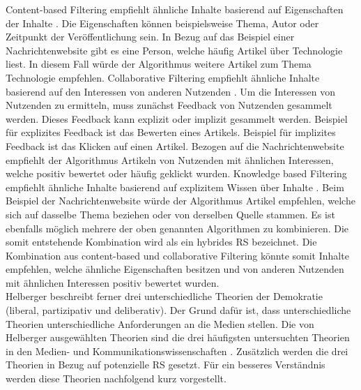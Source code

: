 Content-based Filtering empfiehlt ähnliche Inhalte basierend auf Eigenschaften der Inhalte \cite{content-based-rs}.
Die Eigenschaften können beispielsweise Thema, Autor oder Zeitpunkt der Veröffentlichung sein.
In Bezug auf das Beispiel einer Nachrichtenwebsite gibt es eine Person, welche häufig Artikel über Technologie liest.
In diesem Fall würde der Algorithmus weitere Artikel zum Thema Technologie empfehlen.
Collaborative Filtering empfiehlt ähnliche Inhalte basierend auf den Interessen von anderen Nutzenden \cite{collaborative-filtering-rs}.
Um die Interessen von Nutzenden zu ermitteln, muss zunächst Feedback von Nutzenden gesammelt werden.
Dieses Feedback kann explizit oder implizit gesammelt werden.
Beispiel für explizites Feedback ist das Bewerten eines Artikels.
Beispiel für implizites Feedback ist das Klicken auf einen Artikel.
Bezogen auf die Nachrichtenwebsite empfiehlt der Algorithmus Artikeln von Nutzenden mit ähnlichen Interessen, welche positiv bewertet oder häufig geklickt wurden.
Knowledge based Filtering empfiehlt ähnliche Inhalte basierend auf explizitem Wissen über Inhalte \cite{knowledge-based-rs}.
Beim Beispiel der Nachrichtenwebsite würde der Algorithmus Artikel empfehlen, welche sich auf dasselbe Thema beziehen oder von derselben Quelle stammen.
Es ist ebenfalls möglich mehrere der oben genannten Algorithmen zu kombinieren.
Die somit entstehende Kombination wird als ein hybrides \ac{RS} bezeichnet.
Die Kombination aus content-based und collaborative Filtering könnte somit Inhalte empfehlen, welche ähnliche Eigenschaften besitzen und von anderen Nutzenden mit ähnlichen Interessen positiv bewertet wurden.\\

Helberger beschreibt ferner drei unterschiedliche Theorien der Demokratie (liberal, partizipativ und deliberativ).
Der Grund dafür ist, dass unterschiedliche Theorien unterschiedliche Anforderungen an die Medien stellen.
Die von Helberger ausgewählten Theorien sind die drei häufigsten untersuchten Theorien in den Medien- und Kommunikationswissenschaften \cite{democratic-theories}.
Zusätzlich werden die drei Theorien in Bezug auf potenzielle \ac{RS} gesetzt.
Für ein besseres Verständnis werden diese Theorien nachfolgend kurz vorgestellt.\\

